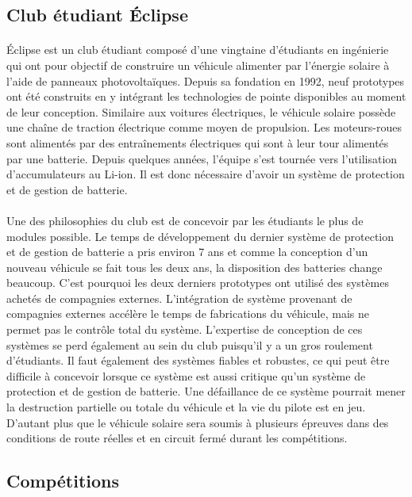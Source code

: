 	\subsection{Club étudiant Éclipse}
	
		\paragraph{}
		Éclipse est un club étudiant composé d'une vingtaine d'étudiants en ingénierie qui ont pour objectif de construire un véhicule alimenter par l'énergie solaire à l'aide de panneaux photovoltaïques. Depuis sa fondation en 1992, neuf prototypes ont été construits en y intégrant les technologies de pointe disponibles au moment de leur conception. Similaire aux voitures électriques, le véhicule solaire possède une chaîne de traction électrique comme moyen de propulsion. Les moteurs-roues sont alimentés par des entraînements électriques qui sont à leur tour alimentés par une batterie. Depuis quelques années, l'équipe s'est tournée vers l'utilisation d'accumulateurs au Li-ion. Il est donc nécessaire d'avoir un système de protection et de gestion de batterie.
		
		\paragraph{}
		Une des philosophies du club est de concevoir par les étudiants le plus de modules possible. Le temps de développement du dernier système de protection et de gestion de batterie a pris environ 7 ans et comme la conception d'un nouveau véhicule se fait tous les deux ans, la disposition des batteries change beaucoup. C'est pourquoi les deux derniers prototypes ont utilisé des systèmes achetés de compagnies externes. L'intégration de système provenant de compagnies externes accélère le temps de fabrications du véhicule, mais ne permet pas le contrôle total du système. L'expertise de conception de ces systèmes se perd également au sein du club puisqu'il y a un gros roulement d'étudiants. Il faut également des systèmes fiables et robustes, ce qui peut être difficile à concevoir lorsque ce système est aussi critique qu'un système de protection et de gestion de batterie. Une défaillance de ce système pourrait mener la destruction partielle ou totale du véhicule et la vie du pilote est en jeu. D'autant plus que le véhicule solaire sera soumis à plusieurs épreuves dans des conditions de route réelles et en circuit fermé durant les compétitions.
	
	\subsection{Compétitions}

